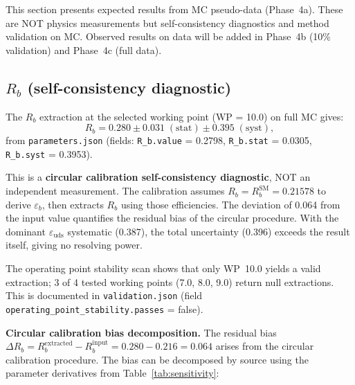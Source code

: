 \documentclass[11pt,a4paper]{article}
\begin{document}
This section presents expected results from MC pseudo-data (Phase~4a). These are
NOT physics measurements but self-consistency diagnostics and method validation
on MC. Observed results on data will be added in Phase~4b (10\% validation) and
Phase~4c (full data).

\subsection{$R_b$ (self-consistency diagnostic)}
\label{sec:result_rb}

The $R_b$ extraction at the selected working point (WP = 10.0) on full MC gives:
\begin{equation}
R_b = 0.280 \pm 0.031\;\mathrm{(stat)} \pm 0.395\;\mathrm{(syst)},
\label{eq:rb_result}
\end{equation}
from \texttt{parameters.json} (fields: \texttt{R\_b.value} = 0.2798,
\texttt{R\_b.stat} = 0.0305, \texttt{R\_b.syst} = 0.3953).

This is a \textbf{circular calibration self-consistency diagnostic}, NOT an independent
measurement. The calibration assumes $R_b = R_b^\mathrm{SM} = 0.21578$ to derive
$\varepsilon_b$, then extracts $R_b$ using those efficiencies. The deviation of 0.064
from the input value quantifies the residual bias of the circular procedure. With the
dominant $\varepsilon_\mathrm{uds}$ systematic (0.387), the total uncertainty (0.396)
exceeds the result itself, giving no resolving power.

The operating point stability scan shows that only WP~10.0 yields a valid extraction;
3 of 4 tested working points (7.0, 8.0, 9.0) return null extractions. This is documented
in \texttt{validation.json} (field \texttt{operating\_point\_stability.passes} = false).

\textbf{Circular calibration bias decomposition.}
The residual bias $\Delta R_b = R_b^\mathrm{extracted} - R_b^\mathrm{input} =
0.280 - 0.216 = 0.064$ arises from the circular calibration procedure. The bias
can be decomposed by source using the parameter derivatives from
Table~\ref{tab:sensitivity}:
\end{document}
